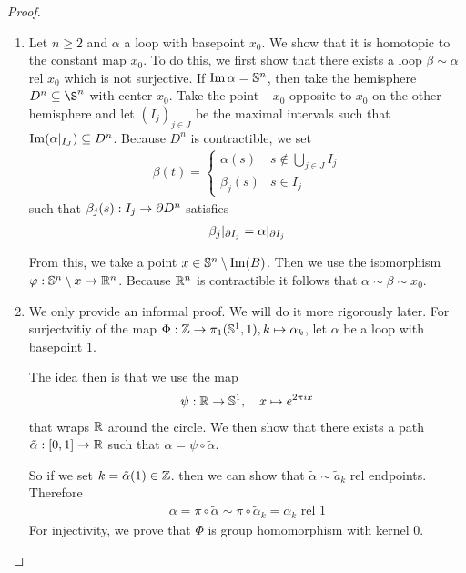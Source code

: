 \begin{proof}
\begin{enumerate}
  \item Let $n \geq 2$ and $\alpha$ a loop with basepoint $x_0$.
    We show that it is homotopic to the constant map $x_0$.
    To do this, we first show that there exists a loop $\beta \sim \alpha$ rel $x_0$ which is not surjective.
    If $\operatorname{Im} \alpha = \mathbb{S}^{n}$, then take the hemisphere $D^{n} \subseteq \S^{n}$ with center $x_0$.
    Take the point $-x_0$ opposite to $x_0$ on the other hemisphere
    and let $(I_j)_{j \in J}$ be the maximal intervals such that $\operatorname{Im}(\alpha |_{I_J}) \subseteq D^{n}$.
    Because $D^{n}$ is contractible, we set
    \begin{align*}
      \beta(t) = \left\{\begin{array}{ll}
          \alpha(s) & s \notin \bigcup_{j \in J}I_j\\
          \beta_j(s) & s \in I_j
      \end{array} \right.
    \end{align*}
    such that $\beta_j(s): I_j \to \partial D^{n}$ satisfies
    \begin{align*}
      \beta_j |_{\partial I_j} = \alpha|_{\partial I_j}
    \end{align*}

    From this, we take a point $x \in \mathbb{S}^{n} \setminus \operatorname{Im}(B)$.
    Then we use the isomorphism $\varphi: \mathbb{S}^{n} \setminus x \to \mathbb{R}^{n}$.
    Because $\mathbb{R}^{n}$ is contractible it follows that $\alpha \sim \beta \sim x_0$.

  \item We only provide an informal proof. We will do it more rigorously later.
    For surjectvitiy of the map $\Phi: \mathbb{Z} \to  \pi_1(\mathbb{S}^{1},1), k \mapsto  \alpha_k$, let $\alpha$ be a loop with basepoint $1$.

    The idea then is that we use the map 
    \begin{align*}
      \psi: \mathbb{R} \to \mathbb{S}^{1}, \quad x \mapsto e^{2 \pi i x}
    \end{align*}
    that wraps $\mathbb{R}$ around the circle.
    We then show that there exists a path $\tilde{\alpha}: [0,1] \to  \mathbb{R}$ such that $\alpha = \psi \circ \tilde{\alpha}$.

    So if we set $k = \tilde{\alpha}(1) \in \mathbb{Z}$. then we can show that $\tilde{\alpha} \sim \tilde{a}_k$ rel endpoints.
    Therefore
    \begin{align*}
      \alpha = \pi \circ \tilde{\alpha} \sim \pi \circ \tilde{\alpha}_k = \alpha_k \text{ rel 1}
    \end{align*}
    For injectivity, we prove that $\Phi$ is group homomorphism with kernel $0$.
\end{enumerate}
\end{proof}


